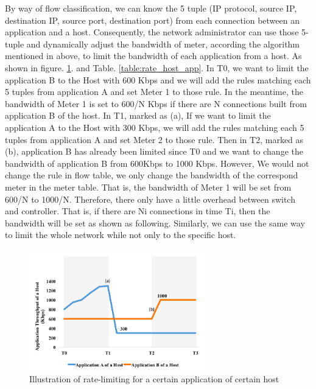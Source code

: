 \documentclass[journal]{IEEEtran}
\begin{document}
By way of flow classification, we can know the 5 tuple (IP protocol, source IP, destination IP, source port, destination port) from each connection between an application and a host. Consequently, the network administrator can use those 5-tuple and dynamically adjust the bandwidth of meter, according the algorithm mentioned in above, to limit the bandwidth of each application from a host.
As shown in figure. \ref{fig:rate_host_app}. and Table. \ref{table:rate_host_app}. In T0, we want to limit the application B to the Host with 600 Kbps and we will add the rules matching each 5 tuples from application A and set Meter 1 to those rule. In the meantime, the bandwidth of Meter 1 is set to 600/N Kbps if there are N connections built from application B of the host.
In T1, marked as (a), If we want to limit the application A to the Host with 300 Kbps, we will add the rules matching each 5 tuples from application A and set Meter 2 to those rule.
Then in T2, marked as (b), application B has already been limited since T0 and we want to change the bandwidth of application B from 600Kbps to 1000 Kbps.
However, We would not change the rule in flow table, we only change the bandwidth of the correspond meter in the meter table. That is, the bandwidth of Meter 1 will be set from 600/N to 1000/N. Therefore, there only have a little overhead between switch and controller. That is, if there are Ni connections in time Ti, then the bandwidth will be set as shown as following.
Similarly, we can use the same way to limit the whole network while not only to the specific host.

\begin{figure}[!t]
\centering
\includegraphics[width=3in]{./figures/rate_host_app}
\caption{Illustration of rate-limiting for a certain application of certain host}
\label{fig:rate_host_app}
\end{figure}
\end{document}
